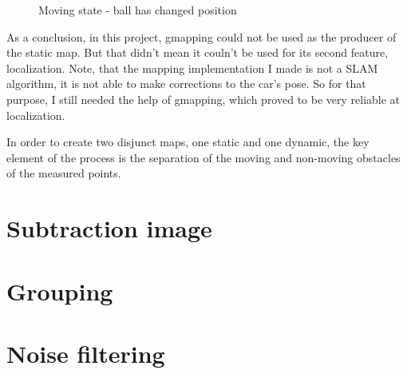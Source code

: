 \begin{figure}[!ht]
\centering
{}
\caption{Moving state - ball has changed position}
\label{gmapping_drawback_after_move}
\end{figure}

As a conclusion, in this project, gmapping could not be used as the producer of the static map. But that didn't mean it couln't be used for its second feature, localization. Note, that the mapping implementation I made is not a SLAM algorithm, it is not able to make corrections to the car's pose. So for that purpose, I still needed the help of gmapping, which proved to be very reliable at localization.

In order to create two disjunct maps, one static and one dynamic, the key element of the process is the separation of the moving and non-moving obstacles of the measured points.

\section{Subtraction image}


\section{Grouping}


\section{Noise filtering}

